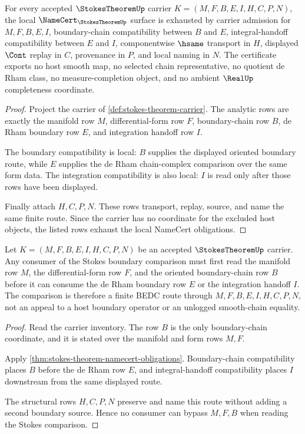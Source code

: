 \begin{theorem}\label{thm:stokes-theorem-namecert-obligations}
For every accepted $\StokesTheoremUp$ carrier $K=(M,F,B,E,I,H,C,P,N)$, the local $\NameCert_{\StokesTheoremUp}$ surface is exhausted by carrier admission for $M,F,B,E,I$, boundary-chain compatibility between $B$ and $E$, integral-handoff compatibility between $E$ and $I$, componentwise $\hsame$ transport in $H$, displayed $\Cont$ replay in $C$, provenance in $P$, and local naming in $N$. The certificate exports no host smooth map, no selected chain representative, no quotient de Rham class, no measure-completion object, and no ambient $\RealUp$ completeness coordinate.
\end{theorem}
\begin{proof}
Project the carrier of \autoref{def:stokes-theorem-carrier}. The analytic rows are exactly the manifold row $M$, differential-form row $F$, boundary-chain row $B$, de Rham boundary row $E$, and integration handoff row $I$.

The boundary compatibility is local: $B$ supplies the displayed oriented boundary route, while $E$ supplies the de Rham chain-complex comparison over the same form data. The integration compatibility is also local: $I$ is read only after those rows have been displayed.

Finally attach $H,C,P,N$. These rows transport, replay, source, and name the same finite route. Since the carrier has no coordinate for the excluded host objects, the listed rows exhaust the local NameCert obligations.
\end{proof}

\begin{theorem}\label{thm:stokes-theorem-boundary-chain-route}
Let $K=(M,F,B,E,I,H,C,P,N)$ be an accepted $\StokesTheoremUp$ carrier. Any consumer of the Stokes boundary comparison must first read the manifold row $M$, the differential-form row $F$, and the oriented boundary-chain row $B$ before it can consume the de Rham boundary row $E$ or the integration handoff $I$. The comparison is therefore a finite BEDC route through $M,F,B,E,I,H,C,P,N$, not an appeal to a host boundary operator or an unlogged smooth-chain equality.
\end{theorem}
\begin{proof}
Read the carrier inventory. The row $B$ is the only boundary-chain coordinate, and it is stated over the manifold and form rows $M,F$.

Apply \autoref{thm:stokes-theorem-namecert-obligations}. Boundary-chain compatibility places $B$ before the de Rham row $E$, and integral-handoff compatibility places $I$ downstream from the same displayed route.

The structural rows $H,C,P,N$ preserve and name this route without adding a second boundary source. Hence no consumer can bypass $M,F,B$ when reading the Stokes comparison.
\end{proof}

